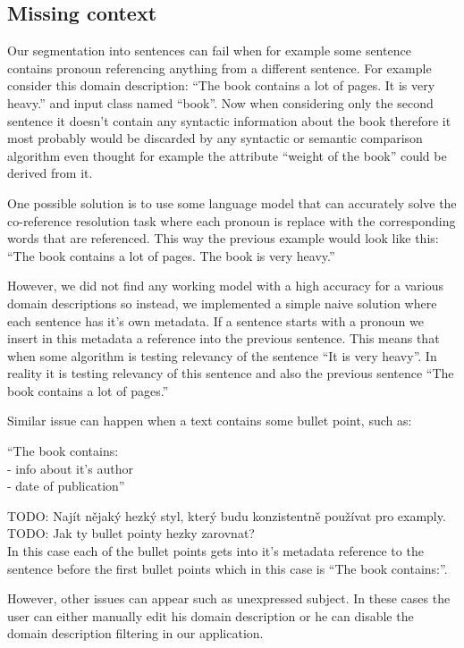 \subsection{Missing context}

Our segmentation into sentences can fail when for example some sentence contains pronoun referencing anything from a different sentence. For example consider this domain description: ``The book contains a lot of pages. It is very heavy.'' and input class named ``book''. Now when considering only the second sentence it doesn't contain any syntactic information about the book therefore it most probably would be discarded by any syntactic or semantic comparison algorithm even thought for example the attribute ``weight of the book'' could be derived from it.

One possible solution is to use some language model that can accurately solve the co-reference resolution task where each pronoun is replace with the corresponding words that are referenced. This way the previous example would look like this: ``The book contains a lot of pages. The book is very heavy.''

However, we did not find any working model with a high accuracy for a various domain descriptions so instead, we implemented a simple naive solution where each sentence has it's own metadata. If a sentence starts with a pronoun we insert in this metadata a reference into the previous sentence. This means that when some algorithm is testing relevancy of the sentence ``It is very heavy''. In reality it is testing relevancy of this sentence and also the previous sentence ``The book contains a lot of pages.''

Similar issue can happen when a text contains some bullet point, such as:

\begin{center}
``The book contains: \\
- info about it's author \\
- date of publication'' \\
\end{center}

TODO: Najít nějaký hezký styl, který budu konzistentně používat pro examply. \\

TODO: Jak ty bullet pointy hezky zarovnat? \\

In this case each of the bullet points gets into it's metadata reference to the sentence before the first bullet points which in this case is ``The book contains:''.

However, other issues can appear such as unexpressed subject. In these cases the user can either manually edit his domain description or he can disable the domain description filtering in our application.